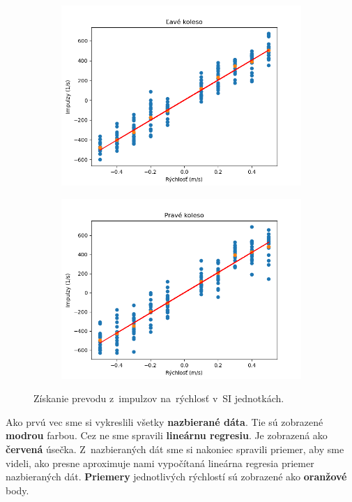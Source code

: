 \begin{figure}[!htbp]
	\begin{subfigure}{0.5\textwidth}
		\includegraphics[width=\textwidth]{img/lw_nf.png}
	\end{subfigure}
	\hfill
	\begin{subfigure}{0.5\textwidth}
		\includegraphics[width=\textwidth]{img/rw_nf.png}
	\end{subfigure}
	\caption{Získanie prevodu z~impulzov na~rýchlosť v~SI jednotkách.}
	\label{fig:rw_lw_nf}
\end{figure}

Ako prvú vec sme si vykreslili všetky \textbf{nazbierané dáta}. Tie sú zobrazené \textbf{modrou} farbou. Cez ne sme spravili \textbf{lineárnu regresiu}. Je zobrazená
ako \textbf{červená} úsečka. Z~nazbieraných dát sme si nakoniec spravili priemer, aby sme videli, ako presne aproximuje nami vypočítaná lineárna regresia priemer
nazbieraných dát. \textbf{Priemery} jednotlivých rýchlostí sú zobrazené ako \textbf{oranžové} body.

